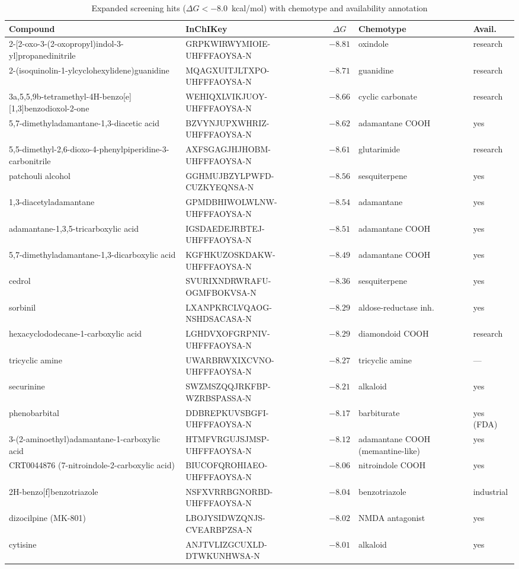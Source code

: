 \documentclass[10pt,letterpaper]{article}
\begin{document}
\begin{table}[t]
\centering
\footnotesize
\caption{Expanded screening hits ($\Delta G < -8.0$~kcal/mol) with chemotype and availability annotation}
\label{tab:expanded}
\begin{tabular}{@{}p{4.6cm}p{3.6cm}cp{2.6cm}p{1.5cm}@{}}
\toprule
Compound & InChIKey & $\Delta G$ & Chemotype & Avail. \\
\midrule
2-[2-oxo-3-(2-oxopropyl)indol-3-yl]propanedinitrile & GRPKWIRWYMIOIE-UHFFFAOYSA-N & $-8.81$ & oxindole & research \\
2-(isoquinolin-1-ylcyclohexylidene)guanidine & MQAGXUITJLTXPO-UHFFFAOYSA-N & $-8.71$ & guanidine & research \\
3a,5,5,9b-tetramethyl-4H-benzo[e][1,3]benzodioxol-2-one & WEHIQXLVIKJUOY-UHFFFAOYSA-N & $-8.66$ & cyclic carbonate & research \\
5,7-dimethyladamantane-1,3-diacetic acid & BZVYNJUPXWHRIZ-UHFFFAOYSA-N & $-8.62$ & adamantane COOH & yes \\
5,5-dimethyl-2,6-dioxo-4-phenylpiperidine-3-carbonitrile & AXFSGAGJHJHOBM-UHFFFAOYSA-N & $-8.61$ & glutarimide & research \\
patchouli alcohol & GGHMUJBZYLPWFD-CUZKYEQNSA-N & $-8.56$ & sesquiterpene & yes \\
1,3-diacetyladamantane & GPMDBHIWOLWLNW-UHFFFAOYSA-N & $-8.54$ & adamantane & yes \\
adamantane-1,3,5-tricarboxylic acid & IGSDAEDEJRBTEJ-UHFFFAOYSA-N & $-8.51$ & adamantane COOH & yes \\
5,7-dimethyladamantane-1,3-dicarboxylic acid & KGFHKUZOSKDAKW-UHFFFAOYSA-N & $-8.49$ & adamantane COOH & yes \\
cedrol & SVURIXNDRWRAFU-OGMFBOKVSA-N & $-8.36$ & sesquiterpene & yes \\
sorbinil & LXANPKRCLVQAOG-NSHDSACASA-N & $-8.29$ & aldose-reductase inh. & yes \\
hexacyclododecane-1-carboxylic acid & LGHDVXOFGRPNIV-UHFFFAOYSA-N & $-8.29$ & diamondoid COOH & research \\
tricyclic amine & UWARBRWXIXCVNO-UHFFFAOYSA-N & $-8.27$ & tricyclic amine & --- \\
securinine & SWZMSZQQJRKFBP-WZRBSPASSA-N & $-8.21$ & alkaloid & yes \\
phenobarbital & DDBREPKUVSBGFI-UHFFFAOYSA-N & $-8.17$ & barbiturate & yes (FDA) \\
3-(2-aminoethyl)adamantane-1-carboxylic acid & HTMFVRGUJSJMSP-UHFFFAOYSA-N & $-8.12$ & adamantane COOH (memantine-like) & yes \\
CRT0044876 (7-nitroindole-2-carboxylic acid) & BIUCOFQROHIAEO-UHFFFAOYSA-N & $-8.06$ & nitroindole COOH & yes \\
2H-benzo[f]benzotriazole & NSFXVRRBGNORBD-UHFFFAOYSA-N & $-8.04$ & benzotriazole & industrial \\
dizocilpine (MK-801) & LBOJYSIDWZQNJS-CVEARBPZSA-N & $-8.02$ & NMDA antagonist & yes \\
cytisine & ANJTVLIZGCUXLD-DTWKUNHWSA-N & $-8.01$ & alkaloid & yes \\
\bottomrule
\end{tabular}
\end{table}
\end{document}
